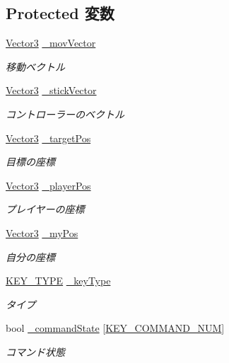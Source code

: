 \subsection*{Protected 変数}
\begin{DoxyCompactItemize}
\item 
\hyperlink{struct_vector3}{Vector3} \hyperlink{class_key_base_a6fea5a402d1fa892a14b9ba08ee7f84e}{\-\_\-mov\-Vector}
\begin{DoxyCompactList}\small\item\em 移動ベクトル \end{DoxyCompactList}\item 
\hyperlink{struct_vector3}{Vector3} \hyperlink{class_key_base_a774649bfb09128dcbe4617c11c448e25}{\-\_\-stick\-Vector}
\begin{DoxyCompactList}\small\item\em コントローラーのベクトル \end{DoxyCompactList}\item 
\hyperlink{struct_vector3}{Vector3} \hyperlink{class_key_base_ad76a22072f7fcdaa7b1900971a67207c}{\-\_\-target\-Pos}
\begin{DoxyCompactList}\small\item\em 目標の座標 \end{DoxyCompactList}\item 
\hyperlink{struct_vector3}{Vector3} \hyperlink{class_key_base_ac2598de02ad18e04b6f2bc929ee56e98}{\-\_\-player\-Pos}
\begin{DoxyCompactList}\small\item\em プレイヤーの座標 \end{DoxyCompactList}\item 
\hyperlink{struct_vector3}{Vector3} \hyperlink{class_key_base_ac312d80c808d22c6c1c1be897b317b3a}{\-\_\-my\-Pos}
\begin{DoxyCompactList}\small\item\em 自分の座標 \end{DoxyCompactList}\item 
\hyperlink{class_key_base_ab22168ade2e4ac686bb475648df75095}{K\-E\-Y\-\_\-\-T\-Y\-P\-E} \hyperlink{class_key_base_ae1164cb4054102ae260eb5dede5c2b48}{\-\_\-key\-Type}
\begin{DoxyCompactList}\small\item\em タイプ \end{DoxyCompactList}\item 
bool \hyperlink{class_key_base_a2ac4c1873c45fdc14f6baf86cfbbbea4}{\-\_\-command\-State} \mbox{[}\hyperlink{class_key_base_a6e2d2326afadb1405879b31e4463e45fa886ced2b7b9c443cbfbac07192978d6e}{K\-E\-Y\-\_\-\-C\-O\-M\-M\-A\-N\-D\-\_\-\-N\-U\-M}\mbox{]}
\begin{DoxyCompactList}\small\item\em コマンド状態 \end{DoxyCompactList}\end{DoxyCompactItemize}


